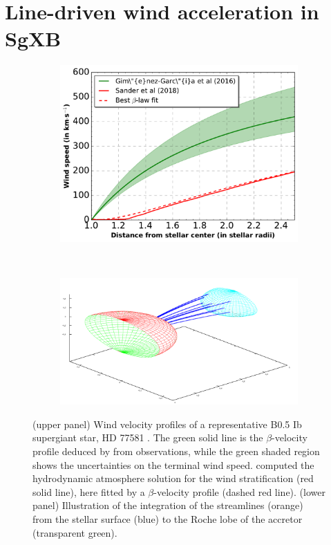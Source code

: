 \documentclass[letter]{aa}
\begin{document}
\section{Line-driven wind acceleration in SgXB}
\label{sec:}

\begin{figure}
\begin{subfigure}{.5\textwidth}
\centering
\includegraphics[width=0.99\columnwidth]{Pictures/vel_prof.pdf}
  \label{fig:vel_prof}
\end{subfigure}
\phantom{p}\\
\begin{subfigure}{.5\textwidth}
\centering
\includegraphics[width=0.99\columnwidth]{Pictures/3D.png}
  \label{fig:3D}
\end{subfigure}
\caption{(upper panel) Wind velocity profiles of a representative B0.5 Ib supergiant star, HD 77581 \citep[the donor star in Vela X-1][]{Hiltner1972,Forman1973}. The green solid line is the $\beta$-velocity profile deduced by \cite{Gimenez-Garcia2016} from observations, while the green shaded region shows the uncertainties on the terminal wind speed. \cite{Sander2017} computed the hydrodynamic atmosphere solution for the wind stratification (red solid line), here fitted by a $\beta$-velocity profile (dashed red line). (lower panel) Illustration of the integration of the streamlines (orange) from the stellar surface (blue) to the Roche lobe of the accretor (transparent green).}
\label{fig:setup}
\end{figure} 
\end{document}
